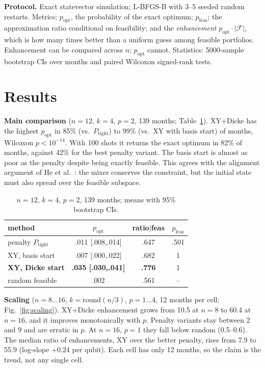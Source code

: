 \documentclass[10pt,a4paper,twocolumn]{article}
\begin{document}
\textbf{Protocol.} Exact statevector simulation; L-BFGS-B with 3--5 seeded random restarts. Metrics: $p_\text{opt}$, the probability of the exact optimum; $p_\text{feas}$; the approximation ratio conditional on feasibility; and the \emph{enhancement} $p_\text{opt}\cdot|\mathcal F|$, which is how many times better than a uniform guess among feasible portfolios. Enhancement can be compared across $n$; $p_\text{opt}$ cannot. Statistics: 5000-sample bootstrap CIs over months and paired Wilcoxon signed-rank tests.

\section{Results}
\textbf{Main comparison} ($n=12$, $k=4$, $p=2$, 139 months; Table~\ref{tab:main}). XY+Dicke has the highest $p_\text{opt}$ in 85\% (vs.\ $P_\text{tight}$) to 99\% (vs.\ XY with basis start) of months, Wilcoxon $p<10^{-14}$. With 100 shots it returns the exact optimum in 82\% of months, against 42\% for the best penalty variant. The basis start is almost as poor as the penalty despite being exactly feasible. This agrees with the alignment argument of He et al.\ \cite{he2023}: the mixer conserves the constraint, but the initial state must also spread over the feasible subspace.

\begin{table}[t]\centering\small
\caption{$n=12$, $k=4$, $p=2$, 139 months; means with 95\% bootstrap CIs.}\label{tab:main}
\begin{tabular}{lccc}\toprule
method & $p_\text{opt}$ & ratio$|$feas & $p_\text{feas}$\\\midrule
penalty $P_\text{tight}$ & .011 [.008,.014] & .647 & .501\\
XY, basis start & .007 [.000,.022] & .682 & 1\\
\textbf{XY, Dicke start} & \textbf{.035 [.030,.041]} & \textbf{.776} & 1\\
random feasible & .002 & .561 & --\\\bottomrule
\end{tabular}\end{table}

\textbf{Scaling} ($n=8\ldots16$, $k=\mathrm{round}(n/3)$, $p=1\ldots4$, 12 months per cell; Fig.~\ref{fig:scaling}). XY+Dicke enhancement grows from 10.5 at $n=8$ to 60.4 at $n=16$, and it improves monotonically with $p$. Penalty variants stay between 2 and 9 and are erratic in $p$. At $n=16$, $p=1$ they fall below random (0.5--0.6). The median ratio of enhancements, XY over the better penalty, rises from 7.9 to 55.9 (log-slope $+0.24$ per qubit). Each cell has only 12 months, so the claim is the trend, not any single cell.
\end{document}

